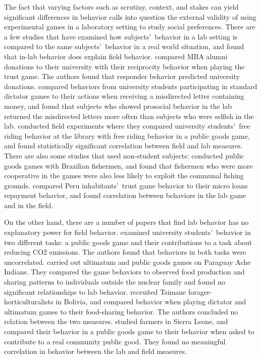 \documentclass[12pt]{article}
\begin{document}
The fact that varying factors such as scrutiny, context, and stakes can yield significant differences in behavior calls into question the external validity of using experimental games in a laboratory setting to study social preferences. There are a few studies that have examined how subjects\rq \ behavior in a lab setting is compared to the same subjects\rq  \ behavior in a real world situation, and found that in-lab behavior does explain field behavior. \cite{baran_2010} compared MBA alumni donations to their university with their reciprocity behavior when playing the trust game. The authors found that responder behavior predicted university donations. \cite{franzen_pointner_2012} compared behaviors from university students participating in standard dictator games to their actions when receiving a misdirected letter containing money, and found that subjects who showed prosocial behavior in the lab returned the misdirected letters more often than subjects who were selfish in the lab. \cite{englmaier_gebhardt_2011} conducted field experiments where they compared university students\rq \ free riding behavior at the library with free riding behavior in a public goods game, and found statistically significant correlation between field and lab measures. There are also some studies that used non-student subjects: \cite{fehr_leibbrandt_2011} conducted public goods games with Brazilian fishermen, and found that fishermen who were more cooperative in the games were also less likely to exploit the communal fishing grounds. \cite{karlan_2005} compared Peru inhabitants\rq \ trust game behavior to their micro loans repayment behavior, and found correlation between behaviors in the lab game and in the field. 

On the other hand, there are a number of papers that find lab behavior has no explanatory power for field behavior. \cite{goeschl_2015} examined university students\rq \ behavior in two different tasks: a public goods game and their contributions to a task about reducing CO2 emissions. The authors found that behaviors in both tasks were uncorrelated. \cite{hill_gurven_2004} carried out ultimatum and public goods games on Paraguay Ache Indians. They compared the game behaviors to observed food production and sharing patterns to individuals outside the nuclear family and found no significant relationships to lab behavior. \cite{gurven_winking_2008} recruited Tsimane forager-horticulturalists in Bolivia, and compared behavior when playing dictator and ultimatum games to their food-sharing behavior. The authors concluded no relation between the two measures. \cite{voors_2012} studied farmers in Sierra Leone, and compared their behavior in a public goods game to their behavior when asked to contribute to a real community public good. They found no meaningful correlation in behavior between the lab and field measures. 
\end{document}
